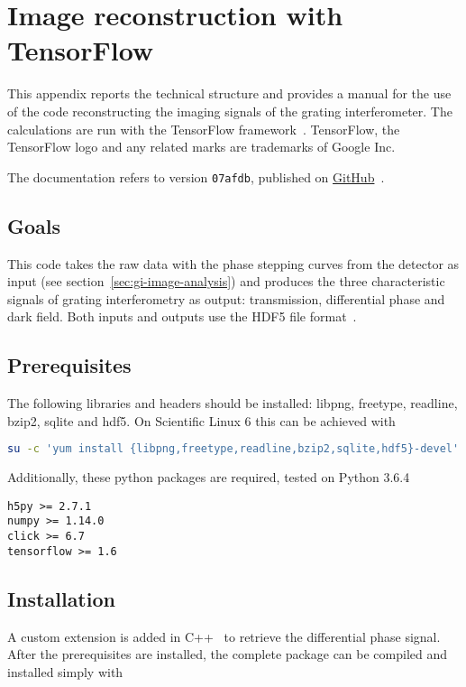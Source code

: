 \chapter{Image reconstruction with TensorFlow\texttrademark}
This appendix reports the technical structure and provides a manual for the
use of the code reconstructing the imaging signals of the grating
interferometer. The calculations are run with the TensorFlow
framework~\parencite{tensorflow2015-whitepaper}.
TensorFlow, the TensorFlow logo and any related marks are trademarks of
Google Inc.

The documentation refers to version \texttt{07afdb}, published on 
\href{https://github.com/Enucatl/dpc_reconstruction/tree/420ed0e17fa827c710df1d25b96dc02a45ff0488}{GitHub}~\parencite{dpc_reconstruction}.

\section{Goals}
This code takes the raw data with the phase stepping curves from the
detector as input (see section~\ref{sec:gi-image-analysis}) and produces the
three characteristic signals of grating interferometry as output:
transmission, differential phase and dark field.
Both inputs and outputs use the HDF5 file format~\parencite{hdf5}.

\section{Prerequisites}
The following libraries and headers should be installed:
libpng, freetype, readline, bzip2, sqlite and hdf5. On Scientific Linux 6 this can be achieved with
\begin{lstlisting}[language=bash]
    su -c 'yum install {libpng,freetype,readline,bzip2,sqlite,hdf5}-devel'
\end{lstlisting}
Additionally, these python packages are required, tested on Python
3.6.4~\parencite{python}
\begin{lstlisting}
h5py >= 2.7.1
numpy >= 1.14.0
click >= 6.7
tensorflow >= 1.6
\end{lstlisting}

\section{Installation}
A custom extension is added in C++~\parencite{Stroustrup:2013:CPL:2543987} to
retrieve the differential phase signal. After the prerequisites are
installed, the complete package can be compiled and installed simply with

